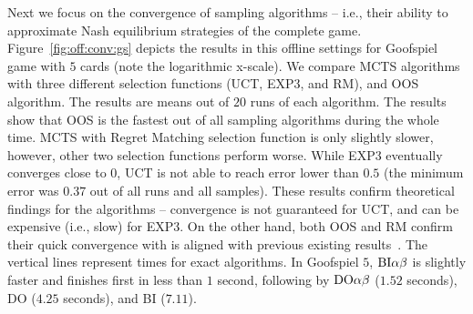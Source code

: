 Next we focus on the convergence of sampling algorithms -- i.e., their ability to approximate Nash equilibrium strategies of the complete game. 
Figure~\ref{fig:off:conv:gs} depicts the results in this offline settings for Goofspiel game with $5$ cards (note the logarithmic x-scale).
We compare MCTS algorithms with three different selection functions (UCT, EXP3, and RM), and OOS algorithm. 
The results are means out of $20$ runs of each algorithm.
The results show that OOS is the fastest out of all sampling algorithms during the whole time. 
MCTS with Regret Matching selection function is only slightly slower, however, other two selection functions perform worse. 
While EXP3 eventually converges close to $0$, UCT is not able to reach error lower than $0.5$ (the minimum error was $0.37$ out of all runs and all samples).
These results confirm theoretical findings for the algorithms -- convergence is not guaranteed for UCT, and can be expensive (i.e., slow) for EXP3. 
On the other hand, both OOS and RM confirm their quick convergence with is aligned with previous existing results~\cite{}.
The vertical lines represent times for exact algorithms.
In Goofspiel $5$, $\textrm{BI}\alpha\beta$ is slightly faster and finishes first in less than $1$ second, following by $\textrm{DO}\alpha\beta$ ($1.52$ seconds), \textsc{DO} ($4.25$ seconds), and \textsc{BI} ($7.11$).


